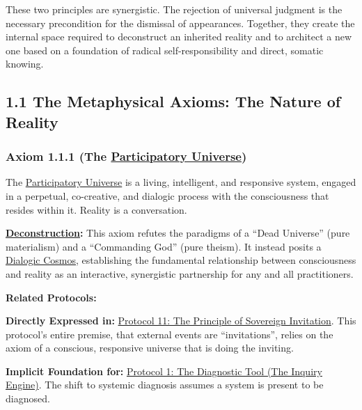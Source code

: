 \documentclass{article}
\begin{document}
These two principles are synergistic. The rejection of universal judgment is the necessary precondition for the dismissal of appearances. Together, they create the internal space required to deconstruct an inherited reality and to architect a new one based on a foundation of radical self-responsibility and direct, somatic knowing.

\subsection*{1.1 The Metaphysical Axioms: The Nature of Reality}

\subsubsection*{Axiom 1.1.1 (The \hyperlink{gloss:participatory_universe}{Participatory Universe})} \label{axiom_1_1_1_the_participatory_universe}
The \hyperlink{gloss:participatory_universe}{Participatory Universe} is a living, intelligent, and responsive system, engaged in a perpetual, co-creative, and dialogic process with the consciousness that resides within it. Reality is a conversation.
\begin{nobullet}
    \item \textbf{\hyperlink{gloss:deconstruction}{Deconstruction}:} This axiom refutes the paradigms of a ``Dead Universe'' (pure materialism) and a ``Commanding God'' (pure theism). It instead posits a \hyperlink{gloss:dialogic_cosmos}{Dialogic Cosmos}, establishing the fundamental relationship between consciousness and reality as an interactive, synergistic partnership for any and all practitioners.
    \item \textbf{Related Protocols:}
        \begin{nobullet}
            \item \textbf{Directly Expressed in:} \hyperref[protocol_11_the_principle_of_sovereign_invitation]{Protocol 11: The Principle of Sovereign Invitation}. This protocol's entire premise, that external events are ``invitations'', relies on the axiom of a conscious, responsive universe that is doing the inviting.
            \item \textbf{Implicit Foundation for:} \hyperref[protocol_1_the_diagnostic_tool_the_inquiry_engine]{Protocol 1: The Diagnostic Tool (The Inquiry Engine)}. The shift to systemic diagnosis assumes a system is present to be diagnosed.
        \end{nobullet}
\end{nobullet}
\end{document}

